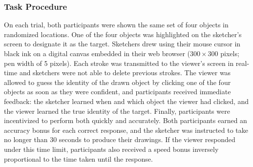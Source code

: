 \documentclass[10pt,letterpaper]{article}
\begin{document}
\subsubsection{Task Procedure}

On each trial, both participants were shown the same set of four objects in randomized locations.
One of the four objects was highlighted on the sketcher's screen to designate it as the target.
Sketchers drew using their mouse cursor in black ink on a digital canvas embedded in their web browser ($300 \times 300$ pixels; pen width of 5 pixels).
Each stroke was transmitted to the viewer's screen in real-time and sketchers were not able to delete previous strokes.
The viewer was allowed to guess the identity of the drawn object by clicking one of the four objects as soon as they were confident, and participants received immediate feedback: the sketcher learned when and which object the viewer had clicked, and the viewer learned the true identity of the target.
Finally, participants were incentivized to perform both quickly and accurately.
Both participants earned an accuracy bonus for each correct response, and the sketcher was instructed to take no longer than 30 seconds to produce their drawings.
If the viewer responded under this time limit, participants also received a speed bonus inversely proportional to the time taken until the response.


\end{document}
